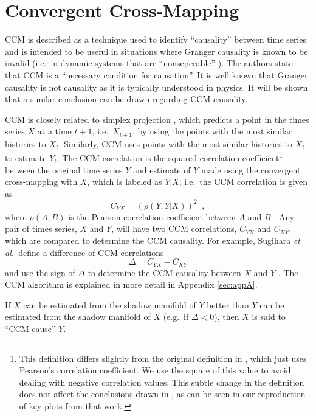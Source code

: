 \documentclass[a4paper,11pt]{article}
\begin{document}
\section{Convergent Cross-Mapping}
CCM is described as a technique used to identify ``causality'' between time series and is intended to be useful in situations where Granger causality is known to be invalid (i.e.\ in dynamic systems that are ``nonseperable'' \cite{Sugihara2012}).  The authors state that CCM is a ``necessary condition for causation''.  It is well known \cite{Granger1980,liu2012,Roberts1985} that Granger causality is not causality as it is typically understood in physics.  It will be shown that a similar conclusion can be drawn regarding CCM causality. 

CCM is closely related to simplex projection \cite{Sugihara1990,Sugihara1990a}, which predicts a point in the times series $X$ at a time $t+1$, i.e.\ $X_{t+1}$, by using the points with the most similar histories to $X_t$.  Similarly, CCM uses points with the most similar histories to $X_t$ to estimate $Y_t$.  The CCM correlation is the squared correlation coefficient\footnote{This definition differs slightly from the original definition in \cite{Sugihara2012}, which just uses Pearson’s correlation coefficient.  We use the square of this value to avoid dealing with negative correlation values.  This subtle change in the definition does not affect the conclusions drawn in \cite{Sugihara2012}, as can be seen in our reproduction of key plots from that work.} between the original time series $Y$ and estimate of $Y$ made using the convergent cross-mapping with $X$, which is labeled as $Y|X$; i.e.\ the CCM correlation is given as 
$$
C_{YX} = \left(\rho\left(Y,Y|X\right)\right)^2\;\;,
$$
where $\rho(A,B)$ is the Pearson correlation coefficient between $A$ and $B$ \cite{}.  Any pair of times series, $X$ and $Y$, will have two CCM correlations, $C_{YX}$ and $C_{XY}$, which are compared to determine the CCM causality.  For example, Sugihara {\em et al.\ }define a difference of CCM correlations
\begin{equation}
\label{eqn:delta}
\Delta = C_{YX} - C_{XY}
\end{equation}
and use the sign of $\Delta$ to determine the CCM causality between $X$ and $Y$ \cite{Sugihara2012}.  The CCM algorithm is explained in more detail in Appendix \ref{sec:appA}.

If $X$ can be estimated from the shadow manifold of $Y$ better than $Y$ can be estimated from the shadow manifold of $X$ (e.g.\ if $\Delta < 0$), then $X$ is said to ``CCM cause'' $Y$.
\end{document}
